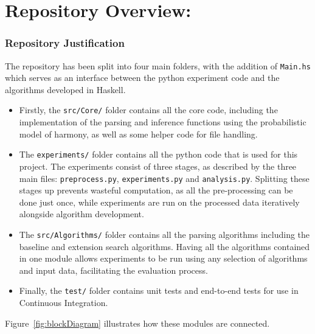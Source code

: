 \documentclass[12pt,a4paper,twoside,openright]{report}
\theoremstyle{definition}
\begin{document}
\section{Repository Overview:}

\subsubsection{Repository Justification}

The repository has been split into four main folders, with the addition of \texttt{Main.hs} which serves as an interface between the python experiment code and the algorithms developed in Haskell. 
\begin{itemize}
  \item Firstly, the \texttt{src/Core/} folder contains all the core code, including the implementation of the parsing  and inference functions using the probabilistic model of harmony, as well as some helper code for file handling. 
  \item The \texttt{experiments/} folder contains all the python code that is used for this project. The experiments consist of three stages, as described by the three main files: \texttt{preprocess.py}, \texttt{experiments.py} and \texttt{analysis.py}. Splitting these stages up prevents wasteful computation, as all the pre-processing can be done just once, while experiments are run on the processed data iteratively alongside algorithm development. 
  \item The \texttt{src/Algorithms/} folder contains all the parsing algorithms including the baseline and extension search algorithms. Having all the algorithms contained in one module allows experiments to be run using any selection of algorithms and input data, facilitating the evaluation process.  
  \item Finally, the \texttt{test/} folder contains unit tests and end-to-end tests for use in Continuous Integration.
\end{itemize}

Figure~\ref{fig:blockDiagram} illustrates how these modules are connected. 
\end{document}
